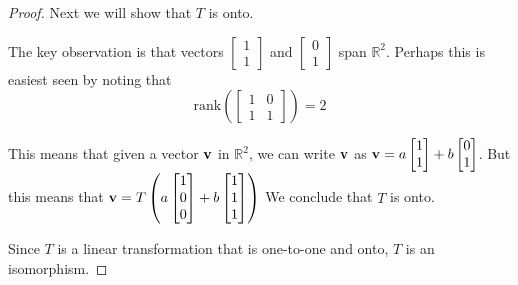 \documentclass{ximera}
\renewcommand{\vec}[1]{{\bf #1}}
\newcommand{\RR}{\mathbb{R}}
\begin{document}
\begin{example}
\begin{proof}
Next we will show that $T$ is onto.  

The key observation is that vectors $\begin{bmatrix}1\\1\end{bmatrix}$ and $\begin{bmatrix}0\\1\end{bmatrix}$ span $\RR^2$.  Perhaps this is easiest seen by noting that $$\text{rank}\left(\begin{bmatrix}1&0\\1&1\end{bmatrix}\right)=2$$

This means that given a vector $\vec{v}$ in $\RR^2$, we can write $\vec{v}$ as $\vec{v}=a\begin{bmatrix}1\\1\end{bmatrix}+b\begin{bmatrix}0\\1\end{bmatrix}$.  But this means that $\vec{v}=T\left(a\begin{bmatrix}1\\0\\0\end{bmatrix}+b\begin{bmatrix}1\\1\\1\end{bmatrix}\right)$  We conclude that $T$ is onto. 

Since $T$ is a linear transformation that  is one-to-one and onto, $T$ is an isomorphism.
\end{proof}
\end{example}
\end{document}
